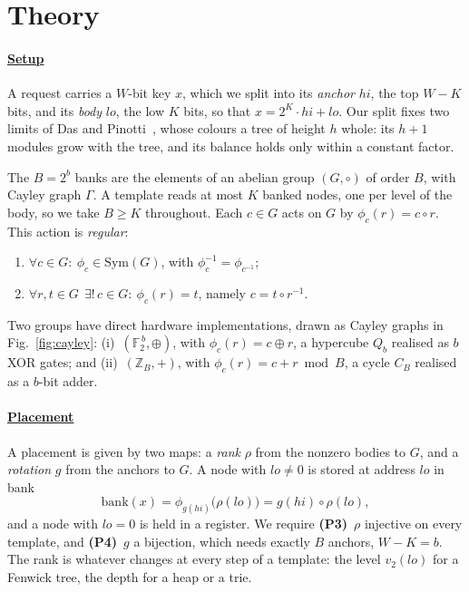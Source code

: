 

\section{Theory}\label{sec:theory}

\paragraph{\underline{Setup}}
A request carries a $W$-bit key $x$, which we split into its \emph{anchor} $hi$, the top
$W - K$ bits, and its \emph{body} $lo$, the low $K$ bits, so that $x = 2^K \cdot hi + lo$. Our split fixes two limits of Das and Pinotti~\cite{das2000mappings}, whose colours a tree
of height $h$ whole: its $h + 1$ modules grow with the tree, and its balance holds only
within a constant factor.

The $B = 2^b$ banks are the elements of an abelian group $(G, \circ)$ of order $B$, with
Cayley graph $\Gamma$. A template reads at most $K$ banked nodes, one per level of the
body, so we take $B \ge K$ throughout. Each $c \in G$ acts on $G$ by
$\phi_c(r) = c \circ r$. This action is
\emph{regular}:
\begin{enumerate}
	\item[\textbf{(P1)}] $\forall c \in G:\ \phi_c \in \mathrm{Sym}(G)$, with $\phi_c^{-1} = \phi_{c^{-1}}$;
	\item[\textbf{(P2)}] $\forall r, t \in G\ \ \exists!\, c \in G:\ \phi_c(r) = t$, namely $c = t \circ r^{-1}$.
\end{enumerate}
Two groups have direct hardware implementations, drawn as Cayley graphs in
Fig.~\ref{fig:cayley}: (i)~$(\mathbb{F}_2^{\,b}, \oplus)$, with $\phi_c(r) = c \oplus r$, a
hypercube $Q_b$ realised as $b$ XOR gates; and (ii)~$(\mathbb{Z}_B, +)$, with
$\phi_c(r) = c + r \bmod B$, a cycle $C_B$ realised as a $b$-bit adder.

\paragraph{\underline{Placement}}
A placement is given by two maps: a \emph{rank} $\rho$ from the nonzero bodies to $G$, and
a \emph{rotation} $g$ from the anchors to $G$. A node with $lo \ne 0$ is stored at address
$lo$ in bank
$$
	\mathrm{bank}(x) = \phi_{g(hi)}\bigl(\rho(lo)\bigr) = g(hi) \circ \rho(lo),
$$
and a node with $lo = 0$ is held in a register. We require \textbf{(P3)}~$\rho$ injective on every
template, and \textbf{(P4)}~$g$ a bijection, which needs exactly $B$ anchors, $W - K = b$. The rank
is whatever changes at every step of a template: the level $v_2(lo)$ for a Fenwick tree,
the depth for a heap or a trie.

